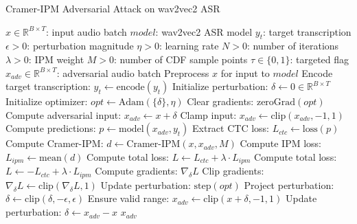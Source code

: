 \documentclass[../main.tex]{subfiles}
\begin{document}
\begin{enumerate}
    \begin{breakablealgorithm}{Cramer-IPM Adversarial Attack on wav2vec2 ASR}
    \begin{algorithmic}[1]
    \Require
        \State $x \in \mathbb{R}^{B \times T}$: input audio batch
        \State $model$: wav2vec2 ASR model
        \State $y_t$: target transcription
        \State $\epsilon > 0$: perturbation magnitude
        \State $\eta > 0$: learning rate
        \State $N > 0$: number of iterations
        \State $\lambda > 0$: IPM weight
        \State $M > 0$: number of CDF sample points
        \State $\tau \in \{0, 1\}$: targeted flag
    \Ensure $x_{adv} \in \mathbb{R}^{B \times T}$: adversarial audio batch
    \State Preprocess $x$ for input to $model$ 
    \State Encode target transcription: $y_t \gets \text{encode}(y_t)$ 
    \State Initialize perturbation: $\delta \gets 0 \in \mathbb{R}^{B \times T}$ 
    \State Initialize optimizer: $opt \gets \text{Adam}(\{\delta\}, \eta)$ 
        \State Clear gradients: $\text{zeroGrad}(opt)$
        \State Compute adversarial input: $x_{adv} \gets x + \delta$
        \State Clamp input: $x_{adv} \gets \text{clip}(x_{adv}, -1, 1)$ 
        \State Compute predictions: $p \gets \text{model}(x_{adv}, y_t)$ 
        \State Extract CTC loss: $L_{ctc} \gets \text{loss}(p)$ 
        \State Compute Cramer-IPM: $d \gets \text{Cramer-IPM}(x, x_{adv}, M)$ 
        \State Compute IPM loss: $L_{ipm} \gets \text{mean}(d)$
         
            \State Compute total loss: $L \gets L_{ctc} + \lambda \cdot L_{ipm}$
        \Else {}
            \State Compute total loss: $L \gets -L_{ctc} + \lambda \cdot L_{ipm}$
        \EndIf
        \State Compute gradients: $\nabla_{\delta} L$ 
        \State Clip gradients: $\nabla_{\delta} L \gets \text{clip}(\nabla_{\delta} L, 1)$ 
        \State Update perturbation: $\text{step}(opt)$ 
        \State Project perturbation: $\delta \gets \text{clip}(\delta, -\epsilon, \epsilon)$ 
        \State Ensure valid range: $x_{adv} \gets \text{clip}(x + \delta, -1, 1)$
        \State Update perturbation: $\delta \gets x_{adv} - x$
    \EndFor
    \State \Return $x_{adv}$ 
    \end{algorithmic}
    \end{breakablealgorithm}
\end{enumerate}
\end{document}
